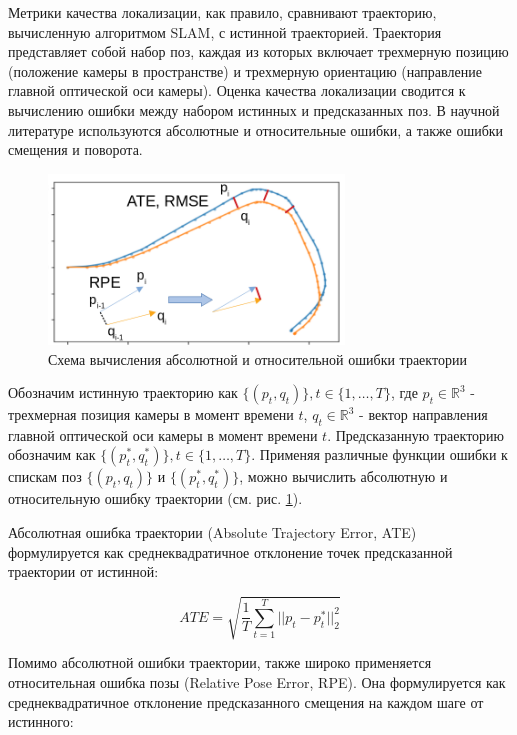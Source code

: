 \documentclass{mipt-thesis-ms}
\begin{document}
	Метрики качества локализации, как правило, сравнивают траекторию, вычисленную алгоритмом SLAM, с истинной траекторией. Траектория представляет собой набор поз, каждая из которых включает трехмерную позицию (положение камеры в пространстве) и трехмерную ориентацию (направление главной оптической оси камеры). Оценка качества локализации сводится к вычислению ошибки между набором истинных и предсказанных поз. В научной литературе используются абсолютные и относительные ошибки, а также ошибки смещения и поворота.
	
	\begin{figure}
		\centering
		\includegraphics[width=0.7\textwidth]{img/localization_metrics.png}
		\caption{Схема вычисления абсолютной и относительной ошибки траектории}
		\label{figure_ate_rpe}
	\end{figure}
	
	Обозначим истинную траекторию как $\{(p_t, q_t)\}, t \in \{1, \dots, T\}$, где $p_t \in \mathbb{R}^3$ - трехмерная позиция камеры в момент времени $t$, $q_t \in \mathbb{R}^3$ - вектор направления главной оптической оси камеры в момент времени $t$. Предсказанную траекторию обозначим как $\{(p_t^*, q_t^*)\}, t \in \{1, \dots, T\}$. Применяя различные функции ошибки к спискам поз $\{(p_t, q_t)\}$ и $\{(p_t^*, q_t^*)\}$, можно вычислить абсолютную и относительную ошибку траектории (см. рис. \ref{figure_ate_rpe}).
	
	Абсолютная ошибка траектории (Absolute Trajectory Error, ATE) формулируется как среднеквадратичное отклонение точек предсказанной траектории от истинной:
	
	\begin{equation}
	\label{eq_ate}
	ATE = \sqrt{\frac{1}{T} \sum_{t=1}^T || p_t - p_t^* ||_2^2}
	\end{equation}
	
	Помимо абсолютной ошибки траектории, также широко применяется относительная ошибка позы (Relative Pose Error, RPE). Она формулируется как среднеквадратичное отклонение предсказанного смещения на каждом шаге от истинного:
	
\end{document}
